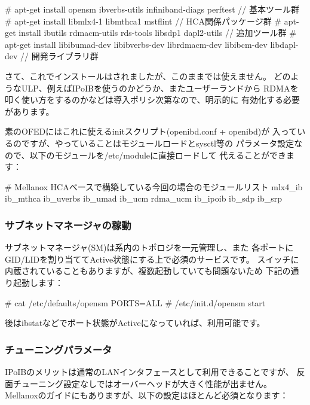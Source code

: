 \documentclass[mingoth,a4paper]{jsarticle}
\begin{document}
\begin{commandline}
# apt-get install opensm ibverbs-utils infiniband-diags perftest                     // 基本ツール群
# apt-get install libmlx4-1 libmthca1 mstflint                                       // HCA関係パッケージ群
# apt-get install ibutils rdmacm-utils rds-tools libsdp1 dapl2-utils                 // 追加ツール群
# apt-get install libibumad-dev libibverbs-dev librdmacm-dev libibcm-dev libdapl-dev // 開発ライブラリ群
\end{commandline}

さて、これでインストールはされましたが、このままでは使えません。
どのようなULP、例えばIPoIBを使うのかどうか、またユーザーランドから
RDMAを叩く使い方をするのかなどは導入ポリシ次第なので、明示的に
有効化する必要があります。

素のOFEDにはこれに使えるinitスクリプト(openibd.conf + openibd)が
入っているのですが、やっていることはモジュールロードとsysctl等の
パラメータ設定なので、以下のモジュールを/etc/moduleに直接ロードして
代えることができます：

\begin{commandline}
# Mellanox HCAベースで構築している今回の場合のモジュールリスト
mlx4_ib ib_mthca ib_uverbs ib_umad ib_ucm rdma_ucm ib_ipoib ib_sdp ib_srp
\end{commandline}

\subsubsection{サブネットマネージャの稼動}
サブネットマネージャ(SM)は系内のトポロジを一元管理し、また
各ポートにGID/LIDを割り当ててActive状態にする上で必須のサービスです。
スイッチに内蔵されていることもありますが、複数起動していても問題ないため
下記の通り起動します：

\begin{commandline}
# cat /etc/defaults/opensm
PORTS=ALL
# /etc/init.d/opensm start
\end{commandline}

後はibstatなどでポート状態がActiveになっていれば、利用可能です。

\subsubsection{チューニングパラメータ}
IPoIBのメリットは通常のLANインタフェースとして利用できることですが、
反面チューニング設定なしではオーバーヘッドが大きく性能が出ません。
Mellanoxのガイドにもありますが、以下の設定はほとんど必須となります：
\end{document}
